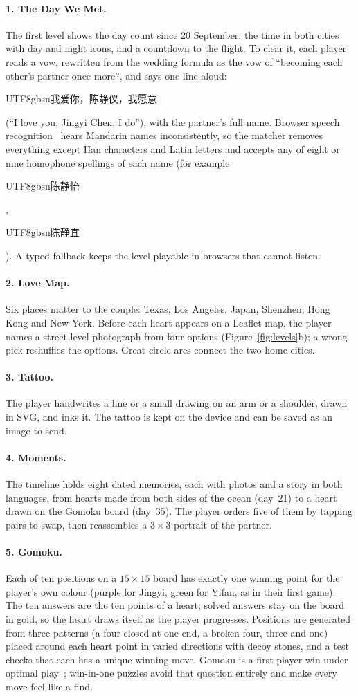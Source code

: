 \documentclass[sigconf,nonacm]{acmart}
\newcommand{\zh}[1]{\begin{CJK*}{UTF8}{gbsn}#1\end{CJK*}}
\begin{document}
\paragraph{1. The Day We Met.} The first level shows the day count since 20 September, the time
in both cities with day and night icons, and a countdown to the flight. To clear it, each player
reads a vow, rewritten from the wedding formula as the vow of ``becoming each other's partner
once more'', and says one line aloud: \zh{我爱你，陈静仪，我愿意} (``I love you, Jingyi Chen, I do''),
with the partner's full name. Browser speech recognition~\cite{w3c2023speech} hears Mandarin
names inconsistently, so the matcher removes everything except Han characters and Latin
letters and accepts any of eight or nine homophone spellings of each name (for example \zh{陈静怡},
\zh{陈静宜}). A typed fallback keeps the level playable in browsers that cannot listen.

\paragraph{2. Love Map.} Six places matter to the couple: Texas, Los Angeles, Japan, Shenzhen,
Hong Kong and New York. Before each heart appears on a Leaflet map, the player names a
street-level photograph from four options (Figure~\ref{fig:levels}b); a wrong pick reshuffles the
options. Great-circle arcs connect the two home cities.

\paragraph{3. Tattoo.} The player handwrites a line or a small drawing on an arm or a shoulder,
drawn in SVG, and inks it. The tattoo is kept on the device and can be saved as an image to send.

\paragraph{4. Moments.} The timeline holds eight dated memories, each with photos and a story in
both languages, from hearts made from both sides of the ocean (day~21) to a heart drawn on the
Gomoku board (day~35). The player orders five of them by tapping pairs to swap, then reassembles a
$3\times3$ portrait of the partner.

\paragraph{5. Gomoku.} Each of ten positions on a $15\times15$ board has exactly one winning point
for the player's own colour (purple for Jingyi, green for Yifan, as in their first game). The ten
answers are the ten points of a heart; solved answers stay on the board in gold, so the heart draws
itself as the player progresses. Positions are generated from three patterns (a four closed at one
end, a broken four, three-and-one) placed around each heart point in varied directions with decoy
stones, and a test checks that each has a unique winning move. Gomoku is a first-player win under
optimal play~\cite{allis1994searching}; win-in-one puzzles avoid that question entirely and make
every move feel like a find.
\end{document}
